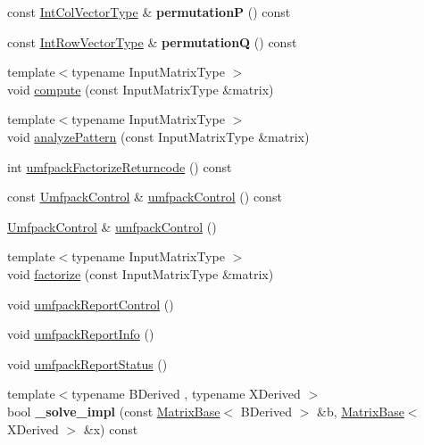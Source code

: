 \begin{DoxyCompactItemize}
const \hyperlink{group___core___module}{Int\+Col\+Vector\+Type} \& {\bfseries permutationP} () const
\item 
\mbox{\label{class_eigen_1_1_umf_pack_l_u_ac28a1e26d4dab8d1ee7c5d10e9770668}} 
const \hyperlink{group___core___module}{Int\+Row\+Vector\+Type} \& {\bfseries permutationQ} () const
\item 
{\footnotesize template$<$typename Input\+Matrix\+Type $>$ }\\void \hyperlink{class_eigen_1_1_umf_pack_l_u_a05fb2b5717ebd67e46b83439721ceee7}{compute} (const Input\+Matrix\+Type \&matrix)
\item 
{\footnotesize template$<$typename Input\+Matrix\+Type $>$ }\\void \hyperlink{class_eigen_1_1_umf_pack_l_u_ac7ea28b2017d6b26b7b08497f294e5e6}{analyze\+Pattern} (const Input\+Matrix\+Type \&matrix)
\item 
int \hyperlink{class_eigen_1_1_umf_pack_l_u_a822fa9d82754269c379dc4ce17920b0a}{umfpack\+Factorize\+Returncode} () const
\item 
const \hyperlink{group___core___module}{Umfpack\+Control} \& \hyperlink{class_eigen_1_1_umf_pack_l_u_ae83d178202f3d44c1789c1c93842bf2e}{umfpack\+Control} () const
\item 
\hyperlink{group___core___module}{Umfpack\+Control} \& \hyperlink{class_eigen_1_1_umf_pack_l_u_a679bd267a0407d4ca985d97f0b864101}{umfpack\+Control} ()
\item 
{\footnotesize template$<$typename Input\+Matrix\+Type $>$ }\\void \hyperlink{class_eigen_1_1_umf_pack_l_u_a1471bf890503e743c45d75cc02a5345d}{factorize} (const Input\+Matrix\+Type \&matrix)
\item 
void \hyperlink{class_eigen_1_1_umf_pack_l_u_ac6ff58ef8eb8221e6af87de750d6619b}{umfpack\+Report\+Control} ()
\item 
void \hyperlink{class_eigen_1_1_umf_pack_l_u_afad062dfc49ca6d2d19d534b3f8f8d28}{umfpack\+Report\+Info} ()
\item 
void \hyperlink{class_eigen_1_1_umf_pack_l_u_a82497bbf75d995a6d4ae7e9191f79525}{umfpack\+Report\+Status} ()
\item 
\mbox{\label{class_eigen_1_1_umf_pack_l_u_af34a7afec0eeef7cae5d7008c00e7b76}} 
{\footnotesize template$<$typename B\+Derived , typename X\+Derived $>$ }\\bool {\bfseries \+\_\+solve\+\_\+impl} (const \hyperlink{group___core___module_class_eigen_1_1_matrix_base}{Matrix\+Base}$<$ B\+Derived $>$ \&b, \hyperlink{group___core___module_class_eigen_1_1_matrix_base}{Matrix\+Base}$<$ X\+Derived $>$ \&x) const

\end{DoxyCompactItemize}
